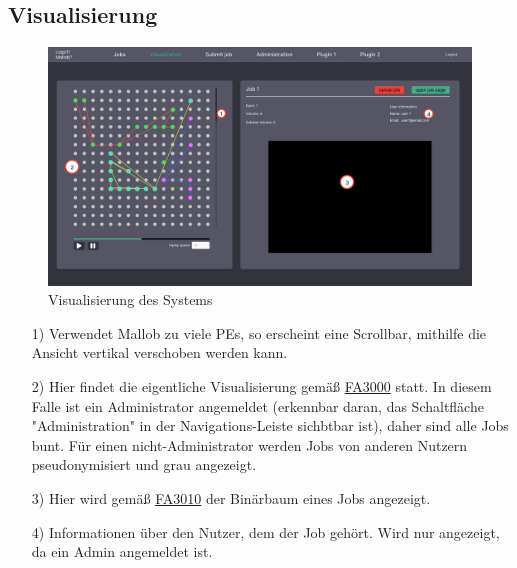 \subsection{Visualisierung}
\label{pages:visualization}
\begin{figure}[H]
    \centering
    \includegraphics[width=\textwidth]{images-interface/v3_interface/visualization_page_v3.pdf}
    \caption{Visualisierung des Systems}
    \label{fig:visualization-page}
\end{figure}
\begin{itemize}
    \item[1)] Verwendet Mallob zu viele PEs, so erscheint eine Scrollbar, mithilfe die Ansicht vertikal verschoben werden kann.
    \item[2)] Hier findet die eigentliche Visualisierung gemäß \hyperref[FA:Web-Interface:Verifizieren eines Kontos]{FA3000} statt. In diesem Falle ist ein Administrator angemeldet (erkennbar daran, das Schaltfläche "Administration" in der Navigations-Leiste sichbtbar ist), daher sind alle Jobs bunt. Für einen nicht-Administrator werden Jobs von anderen Nutzern pseudonymisiert und grau angezeigt.
    \item[3)] Hier wird gemäß \hyperref[FA:Visualisierung:Anzeigen des Binaerbaumes für einen Job]{FA3010} der Binärbaum eines Jobs angezeigt.
    \item[4)] Informationen über den Nutzer, dem der Job gehört. Wird nur angezeigt, da ein Admin angemeldet ist.
\end{itemize}


